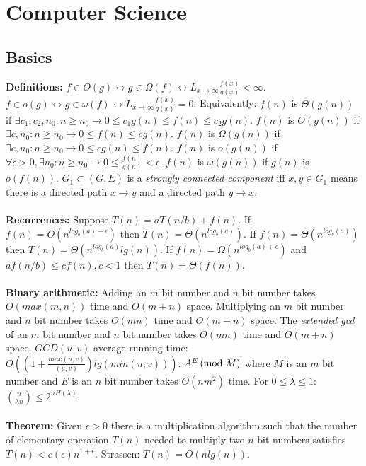 \chapter{Computer Science}
\section{Basics}
{\bf Definitions:}
$f \in O(g) \leftrightarrow
g \in \Omega (f) \leftrightarrow
L_{x \rightarrow \infty} {\frac {f(x)} {g(x)}} < \infty$.
$f \in o(g) \leftrightarrow
g \in \omega (f) \leftrightarrow
L_{x \rightarrow \infty} {\frac {f(x)} {g(x)}} = 0 $.  Equivalently:
$f(n)$ is $\Theta(g(n))$ if $\exists c_1, c_2, n_0: n \geq n_0 \rightarrow 0 \leq c_1 g(n) \leq f(n) \leq c_2 g(n)$.
$f(n)$ is $O(g(n))$ if $\exists c, n_0: n \geq n_0 \rightarrow 0  \leq f(n) \leq c g(n)$.
$f(n)$ is $\Omega(g(n))$ if $\exists c, n_0: n \geq n_0 \rightarrow 0  \leq c g(n) \leq f(n)$.
$f(n)$ is $o(g(n))$ if $\forall \epsilon > 0, \exists n_0: n \geq n_0 \rightarrow 0  \leq {\frac {f(n)} {g(n)}} < \epsilon$.
$f(n)$ is $\omega(g(n))$ if $g(n)$ is $o(f(n))$.
$G_1 \subset (G,E)$ is a
\emph{strongly connected component} iff $x,y \in G_1$ means there is a directed path
$x \rightarrow y$ and a directed path $y \rightarrow x$.
\\
\\
{\bf Recurrences:}  Suppose $T(n)= aT(n/b) + f(n)$.  
If $f(n)= O(n^{log_b(a)-\epsilon})$ then $T(n)= \Theta(n^{log_b(a)})$.
If $f(n)= \Theta(n^{log_b(a)})$ then $T(n)= \Theta(n^{log_b(a)}lg(n))$.
If $f(n)= \Omega(n^{log_b(a)+\epsilon})$ and $af(n/b) \le c f(n), c<1$
then $T(n)= \Theta(f(n))$.\\
\\
{\bf Binary arithmetic:}
Adding an $m$ bit number and $n$ bit number takes $O(max(m,n))$ time and $O(m+n)$ space.
Multiplying an $m$ bit number and $n$ bit number takes $O(mn)$ time and $O(m+n)$ space.
The \emph{extended gcd} of an $m$ bit number and $n$ bit number takes 
$O(mn)$ time and $O(m+n)$ space.
$GCD(u, v)$ average running time:
$O((1+{\frac {max(u,v)} {(u,v)}}) lg(min(u, v)))$.
$A^E \thinspace \textnormal{(mod } M \textnormal{)}$ where $M$ is an $m$ bit number and $E$ is an $n$ bit number 
takes $O(n m^2)$ time. For $0 \leq \lambda \leq 1$: ${n \choose {\lambda n}} \leq 2^{n H(\lambda)}$.
\\
\\
{\bf Theorem:}
Given $\epsilon>0$ there is a multiplication algorithm such that the number
of elementary operation $T(n)$ needed to multiply two $n$-bit numbers
satisfies
$T(n) <c(\epsilon)n^{1+\epsilon}$.  Strassen: $T(n)=O(n lg(n))$.
